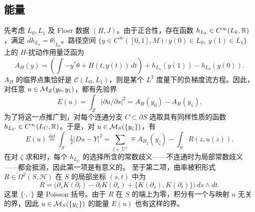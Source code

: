 \subsection{能量}\label{sec:8g}
先考虑 $L_0,L_1$ 及 Floer 数据 $(H,J)$。由于正合性，存在函数 $h_{L_k}\in C^\infty(L_k,\mathbb R)$，满足 $dh_{L_k}=\theta|_{L_k}$。路径空间 $\{y\in C^\infty([0,1],M):y(0)\in L_0,\ y(1)\in L_1\}$ 上的 $H$-扰动作用量泛函为
\begin{equation}\label{eq:8.11}
A_H(y)=\left(\int -y^*\theta+H(t,y(t))\,dt\right)+h_{L_1}(y(1))-h_{L_0}(y(0)).
\end{equation}
$A_H$ 的临界点集恰好是 $\mathcal C(L_0,L_1)$，则是某个 $L^2$ 度量下的负梯度流方程。因此，对任意 $u\in\mathcal M_Z(y_0,y_1)$，都有先验界
\[
E(u)=\int_Z|\partial u/\partial s|^2=A_H(y_0)-A_H(y_1).
\]
为了将这一点推广到，对每个连通分支 $C\subset\partial S$ 选取具有同样性质的函数 $h_{L_C}\in C^\infty(L_C,\mathbb R)$。于是，对 $u\in\mathcal M_S(\{y_\zeta\})$，有
\begin{equation}\label{eq:8.12}
E(u)\overset{\mathrm{def}}=\int_S\tfrac12|Du-Y|^2
=\sum_{\zeta\in\Sigma^\pm}\mp A_{H_\zeta}(y_\zeta)-\int_S R(z,u(z)).
\end{equation}
在对 $\zeta$ 求和时，每个 $h_{L_C}$ 的选择所含的常数歧义——不连通时为局部常数歧义——都会抵消，因此第一项是有意义的。
至于第二项，曲率被积形式 $R\in\Omega^2(S,\mathcal H)$ 在 $S$ 的局部坐标 $(s,t)$ 中为
\[
R=\bigl(\partial_sK(\partial_t)-\partial_tK(\partial_s)
+\{K(\partial_s),K(\partial_t)\}\bigr)\,ds\wedge dt.
\]
这里 $\{\cdot,\cdot\}$ 是 Poisson 括号。由于 $R$ 在 $S$ 的端上为零，积分有一个与映射 $u$ 无关的界，因此 $u\in\mathcal M_S(\{y_\zeta\})$ 的能量 $E(u)$ 也有这样的界。

